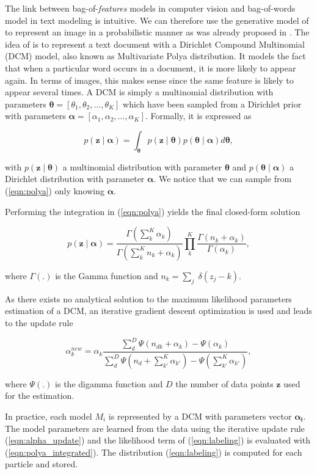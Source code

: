 The link between bag-of-\emph{features} models in computer vision and
bag-of-words model in text modeling is intuitive. We can therefore use
the generative model of \cite{madsen05modeling} to represent an image
in a probabilistic manner as was already proposed in
\cite{ranganathan09bayesian}.  The idea of \cite{madsen05modeling} is
to represent a text document with a Dirichlet Compound Multinomial
(DCM) model, also known as Multivariate Polya distribution. It models
the fact that when a particular word occurs in a document, it is more
likely to appear again. In terms of images, this makes sense since the
same feature is likely to appear several times. A DCM is simply a
multinomial distribution with parameters $\boldsymbol{\theta}=
[\theta_1,\theta_2,\dots,\theta_K]$ which have been sampled from a
Dirichlet prior with parameters $\boldsymbol{\alpha}=
[\alpha_1,\alpha_2,\dots,\alpha_K]$. Formally, it is expressed as

\begin{equation}
\label{eqn:polya}
p(\mathbf{z}\mid \boldsymbol{\alpha}) = \int_{\boldsymbol{\theta}} p(\mathbf{z}\mid \boldsymbol{\theta})
  p(\boldsymbol{\theta}\mid \boldsymbol{\alpha})d\boldsymbol{\theta},
\end{equation}

with $p(\mathbf{z}\mid \boldsymbol{\theta})$ a multinomial distribution with
parameter $\boldsymbol{\theta}$ and $p(\boldsymbol{\theta}\mid \boldsymbol{\alpha})$
a Dirichlet distribution with parameter $\boldsymbol{\alpha}$. We notice that we
can sample from (\ref{eqn:polya}) only knowing $\boldsymbol{\alpha}$.

Performing the integration in (\ref{eqn:polya}) yields the final closed-form
solution

\begin{equation}
\label{eqn:polya_integrated}
p(\mathbf{z}\mid \boldsymbol{\alpha}) =
  \frac{\Gamma(\sum_k^K\alpha_k)}{\Gamma(\sum_k^K n_k + \alpha_k)}
  \prod_k^K\frac{\Gamma(n_k+\alpha_k)}{\Gamma(\alpha_k)},
\end{equation}

where $\Gamma(.)$ is the Gamma function and $n_k=\sum_j\;\delta(z_j-k)$.

As there exists no analytical solution to the maximum likelihood parameters
estimation of a DCM, an iterative gradient descent optimization is used and
leads to the update rule

\begin{equation}
\label{eqn:alpha_update}
\alpha_k^{new} = \alpha_k\frac{\sum_d^D\Psi(n_{dk}+\alpha_k)-\Psi(\alpha_k)}
  {\sum_d^D\Psi(n_d+\sum_{k'}^K\alpha_{k'})-\Psi(\sum_{k'}^K\alpha_{k'})},
\end{equation}

where $\Psi(.)$ is the digamma function and $D$ the number of data points
$\mathbf{z}$ used for the estimation.

In practice, each model $M_i$ is represented by a DCM with parameters vector
$\boldsymbol{\alpha_i}$. The model parameters are learned from the data using
the iterative update rule (\ref{eqn:alpha_update}) and the likelihood term of
(\ref{eqn:labeling}) is evaluated with (\ref{eqn:polya_integrated}). The
distribution (\ref{eqn:labeling}) is computed for each particle and stored.

